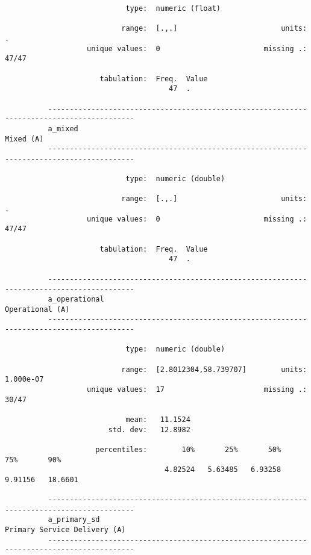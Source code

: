 \documentclass{article}
\begin{document}
\begin{verbatim}
                            type:  numeric (float)
          
                           range:  [.,.]                        units:  .
                   unique values:  0                        missing .:  47/47
          
                      tabulation:  Freq.  Value
                                      47  .
          
          ------------------------------------------------------------------------------------------
          a_mixed                                                                          Mixed (A)
          ------------------------------------------------------------------------------------------
          
                            type:  numeric (double)
          
                           range:  [.,.]                        units:  .
                   unique values:  0                        missing .:  47/47
          
                      tabulation:  Freq.  Value
                                      47  .
          
          ------------------------------------------------------------------------------------------
          a_operational                                                              Operational (A)
          ------------------------------------------------------------------------------------------
          
                            type:  numeric (double)
          
                           range:  [2.8012304,58.739707]        units:  1.000e-07
                   unique values:  17                       missing .:  30/47
          
                            mean:   11.1524
                        std. dev:   12.8982
          
                     percentiles:        10%       25%       50%       75%       90%
                                     4.82524   5.63485   6.93258   9.91156   18.6601
          
          ------------------------------------------------------------------------------------------
          a_primary_sd                                                  Primary Service Delivery (A)
          ------------------------------------------------------------------------------------------
          

\end{verbatim}
\end{document}
